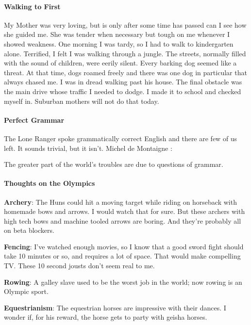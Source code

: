 \paragraph{Walking to First}


My Mother was very loving, but is only after some time has passed can I see how she guided me. She was tender when necessary but tough on me whenever I showed weakness. One morning I was tardy, so I had to walk to kindergarten alone. Terrified, I felt I was walking through a jungle. The streets, normally filled with the sound of children, were eerily silent. Every barking dog seemed like a threat. At that time, dogs roamed freely and there was one dog in particular that always chased me. I was in dread walking past his house. The final obstacle was the main drive whose traffic I needed to dodge. I made it to school and checked myself in. Suburban mothers will not do that today.

\paragraph{Perfect Grammar}


The Lone Ranger spoke grammatically correct English and there are few of us left. It sounds trivial, but it isn't. Michel de Montaigne :

\begin{quotex}
The greater part of the world's troubles are due to questions of grammar.
\end{quotex}


\paragraph{Thoughts on the Olympics}


\textbf{Archery}: The Huns could hit a moving target while riding on horseback with homemade bows and arrows. I would watch that for sure. But these archers with high tech bows and machine tooled arrows are boring. And they're probably all on beta blockers.

\textbf{Fencing}: I've watched enough movies, so I know that a good sword fight should take 10 minutes or so, and requires a lot of space. That would make compelling TV. These 10 second jousts don't seem real to me.

\textbf{Rowing}: A galley slave used to be the worst job in the world; now rowing is an Olympic sport.

\textbf{Equestrianism}: The equestrian horses are impressive with their dances. I wonder if, for his reward, the horse gets to party with geisha horses.

